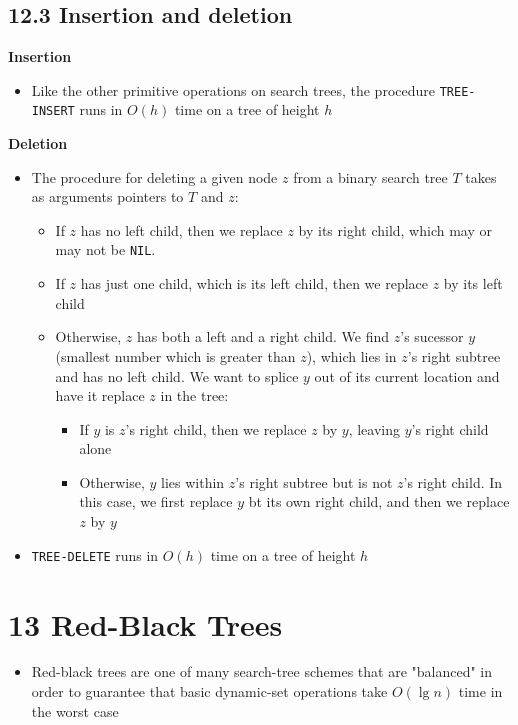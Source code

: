 \documentclass{report}
\begin{document}
\subsection*{12.3 Insertion and deletion}
\textbf{Insertion}
\begin{itemize}
    \item Like the other primitive operations on search trees, the procedure \texttt{TREE-INSERT} runs in $O(h)$ time on a tree of height $h$
\end{itemize}
\textbf{Deletion}
\begin{itemize}
    \item The procedure for deleting a given node $z$ from a binary search tree $T$ takes as arguments pointers to $T$ and $z$:
    \begin{itemize}
        \item If $z$ has no left child, then we replace $z$ by its right child, which may or may not be \texttt{NIL}.
        \item If $z$ has just one child, which is its left child, then we replace $z$ by its left child
        \item Otherwise, $z$ has both a left and a right child. We find $z$'s sucessor $y$ (smallest number which is greater than $z$), which lies in $z$'s right subtree and has no left child. We want to splice $y$ out of its current location and have it replace $z$ in the tree:
        \begin{itemize}
            \item If $y$ is $z$'s right child, then we replace $z$ by $y$, leaving $y$'s right child alone
            \item Otherwise, $y$ lies within $z$'s right subtree but is not $z$'s right child. In this case, we first replace $y$ bt its own right child, and then we replace $z$ by $y$
        \end{itemize}
    \end{itemize}
    \item \texttt{TREE-DELETE} runs in $O(h)$ time on a tree of height $h$
\end{itemize}

\section*{13 Red-Black Trees}
\begin{itemize}
    \item Red-black trees are one of many search-tree schemes that are "balanced" in order to guarantee that basic dynamic-set operations take $O(\lg n)$ time in the worst case
\end{itemize}
\end{document}
